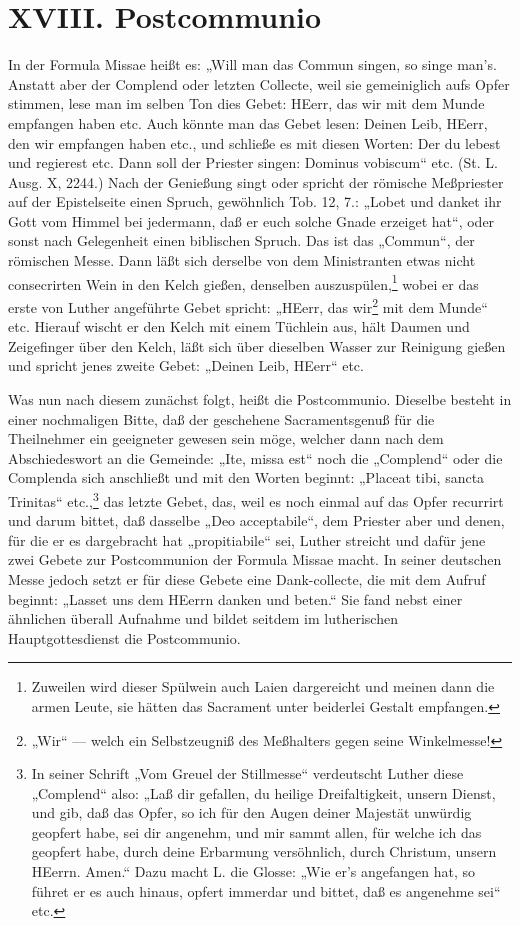 \chapter{XVIII. Postcommunio}


In der Formula Missae heißt es: „Will man das Commun singen, so singe man’s. Anstatt aber der Complend oder letzten Collecte, weil sie gemeiniglich aufs Opfer stimmen, lese man im selben Ton dies Gebet: HEerr, das wir mit dem Munde empfangen haben etc. Auch könnte man das Gebet lesen: Deinen Leib, HEerr, den wir empfangen haben etc., und schließe es mit diesen Worten: Der du lebest und regierest etc. Dann soll der Priester singen: Dominus vobiscum“ etc. (St. L. Ausg. X, 2244.) Nach der Genießung singt oder spricht der römische Meßpriester auf der Epistelseite einen Spruch, gewöhnlich Tob. 12, 7.: „Lobet und danket ihr Gott vom Himmel bei jedermann, daß er euch solche Gnade erzeiget hat“, oder sonst nach Gelegenheit einen biblischen Spruch. Das ist das „Commun“, der römischen Messe. Dann läßt sich
derselbe von dem Ministranten etwas nicht consecrirten Wein in den Kelch gießen, denselben auszuspülen,\footnote{Zuweilen wird dieser Spülwein auch Laien dargereicht und meinen dann die armen Leute, sie hätten das Sacrament unter beiderlei Gestalt empfangen.} wobei er das erste von Luther angeführte Gebet spricht: „HEerr, das wir\footnote{„Wir“ — welch ein Selbstzeugniß des Meßhalters gegen seine Winkelmesse!} mit dem Munde“ etc. Hierauf wischt er den Kelch mit einem Tüchlein aus, hält Daumen und Zeigefinger über den Kelch, läßt sich über dieselben Wasser zur Reinigung gießen und spricht jenes zweite Gebet: „Deinen Leib, HEerr“ etc.

Was nun nach diesem zunächst folgt, heißt die Postcommunio. Dieselbe besteht in einer nochmaligen Bitte, daß der geschehene Sacramentsgenuß für die Theilnehmer ein geeigneter gewesen sein möge, welcher dann nach dem Abschiedeswort an die Gemeinde: „Ite, missa est“ noch die „Complend“ oder die Complenda sich anschließt und mit den Worten beginnt: „Placeat tibi, sancta Trinitas“ etc.,\footnote{In seiner Schrift „Vom Greuel der Stillmesse“ verdeutscht Luther diese „Complend“ also: „Laß dir gefallen, du heilige Dreifaltigkeit, unsern Dienst, und gib, daß das Opfer, so ich für den Augen deiner Majestät unwürdig geopfert habe, sei dir angenehm, und mir sammt allen, für welche ich das geopfert habe, durch deine Erbarmung versöhnlich, durch Christum, unsern HEerrn. Amen.“ Dazu macht L. die Glosse: „Wie er’s angefangen hat, so führet er es auch hinaus, opfert immerdar und bittet, daß es angenehme sei“ etc.} das letzte Gebet, das, weil es noch einmal auf das Opfer recurrirt und darum bittet, daß dasselbe „Deo acceptabile“, dem Priester aber und denen, für die er es dargebracht hat „propitiabile“ sei, Luther streicht und dafür jene zwei Gebete zur Postcommunion der Formula Missae macht. In seiner deutschen Messe jedoch setzt er für diese Gebete eine Dank-collecte, die mit dem Aufruf beginnt: „Lasset uns dem HEerrn danken und beten.“ Sie fand nebst einer ähnlichen überall Aufnahme und bildet seitdem im lutherischen Hauptgottesdienst die Postcommunio.


